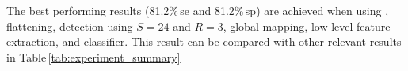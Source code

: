 

The best performing results (81.2\%\,\ac{se} and 81.2\%\,\ac{sp}) are achieved when using \nlm, flattening, \lbptop detection using $S=24$ and $R=3$, global mapping, low-level feature extraction, and \rf classifier. This result can be compared with other relevant results in Table\,\ref{tab:experiment_summary}





